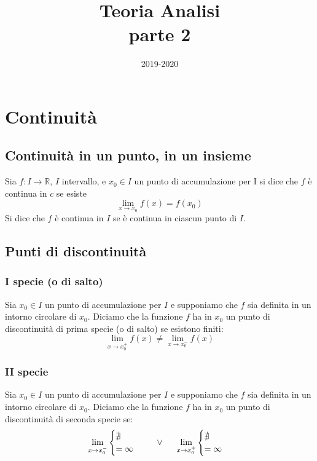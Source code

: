 \documentclass[12pt]{article}
\title{
Teoria Analisi\\
parte 2\\}
\author{}
\date{2019-2020}
\begin{document}
\maketitle

\tableofcontents

\newpage

\section{Continuità}

\subsection{Continuità in un punto, in un insieme}

Sia \(f: I \rightarrow \mathbb{R}\), \(I\) intervallo, e
\(x_0 \in I\) un punto di accumulazione per I
si dice che $f$ è continua in $c$ se esiste
\[  \lim_{x \to x_0} f(x) = f(x_0)\]
Si dice che $f$ è continua in $I$ se è continua in ciascun punto di $I$.

\subsection{Punti di discontinuità}

\subsubsection{I specie (o di salto)}
Sia $x_0 \in I$ un punto di accumulazione per $I$
e supponiamo che $f$ sia definita in un intorno
circolare di $x_0$. Diciamo che la funzione $f$ ha
in $x_0$ un punto di discontinuità di prima specie
(o di salto) se esistono finiti:
\[ \lim_{x \to x_{0}^{+}} f(x) \neq \displaystyle \lim_{x \to x_{0}^{-}} f(x) \]

\subsubsection{II specie}
Sia $x_0 \in I$ un punto di accumulazione per $I$
e supponiamo che $f$ sia definita in un intorno
circolare di $x_0$. Diciamo che la funzione $f$ ha
in $x_0$ un punto di discontinuità di seconda specie se:
\[ \lim_{x \to x_{0}^-} \begin{cases} \nexists \\
= \infty \end{cases} \hspace{0.5cm} \vee \hspace{0.5cm} \lim_{x \to x_{0}^+} \begin{cases} \nexists \\
= \infty \end{cases} \]
\end{document}
